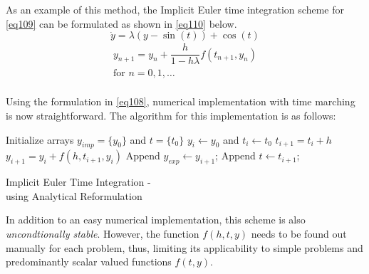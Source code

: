 As an example of this method, the Implicit Euler time integration scheme for \cref{eq109} can be formulated as shown in \cref{eq110} below.
\begin{equation}
\label{eq109}
\dot{y} = \lambda (y - \sin(t)) + \cos(t)
\end{equation}
\begin{equation}
\label{eq110}
\begin{gathered}
y_{n+1} = y_n + \dfrac{h}{1-h\lambda}f(t_{n+1}, y_{n}) \\
\text{for } n = 0,1,\ldots\\ 
\end{gathered}
\end{equation}

Using the formulation in \cref{eq108}, numerical implementation with time marching is now straightforward. The algorithm for this implementation is as follows:
\begin{center}
\smallskip
\begin{minipage}{.7\linewidth}
    \begin{algorithm}[H]
      \SetAlgoLined
      Initialize arrays $y_{imp}=\{y_0\}$ and $t=\{t_0\}$\;
      $y_{i} \gets y_0$ and $t_{i} \gets t_0$\;
        { 
	  $t_{i+1} = t_{i} + h$\;      
      $y_{i+1} = y_{i} + f(h, t_{i+1}, y_i)$\;
      Append $y_{exp} \gets y_{i+1}$;
      Append $t \gets t_{i+1}$;
      }
     \caption{Implicit Euler Time Integration - \\%
     using Analytical Reformulation}
	\label{algo:imp_euler_analytical}
    \end{algorithm}
  \end{minipage}
\end{center}

In addition to an easy numerical implementation, this scheme is also \textit{uncondtionally stable}. However, the function $f(h, t, y)$ needs to be found out manually for each problem, thus, limiting its applicability to simple problems and predominantly scalar valued functions $f(t, y)$. 

